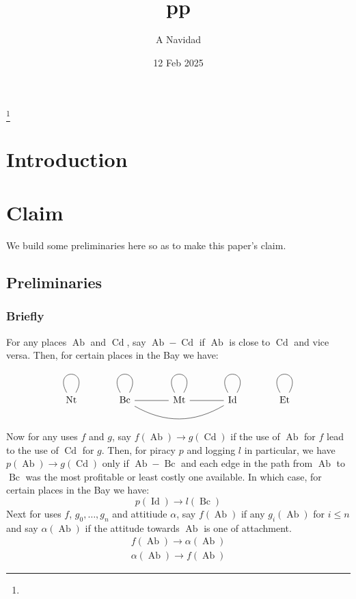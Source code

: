 \documentclass{amsart}
\DeclareMathOperator{\id}{Id}%
\DeclareMathOperator{\mt}{Mt}%
\DeclareMathOperator{\bc}{Bc}%
\DeclareMathOperator{\et}{Et}%
\DeclareMathOperator{\nt}{Nt}%
\DeclareMathOperator{\ab}{Ab}%
\DeclareMathOperator{\cd}{Cd}%
\theoremstyle{definition}%
\theoremstyle{definition}%
\theoremstyle{remark}%
\begin{document}
%
%
\title{pp}
\author{A Navidad}
\address{Harvard College, Cambridge MA}
\date{12 Feb 2025}
\thanks{\lipsum[1][1-3]}%
%
%
\begin{abstract}
\lipsum[1][1-6]
\end{abstract}
\keywords{\lipsum[1][1]}
%
%
\maketitle
%
%
%
%
\section{Introduction}
\label{s:intro}
\lipsum[1-2]
%
%
%
%
\section{Claim}%
\label{s:claim}
We build some preliminaries here so as to make this paper's claim.
%
\subsection{Preliminaries}
\label{ss:prelims}
\subsubsection{Briefly}
\label{sss:briefly}
For any places \(\ab\) and \(\cd\), say \(\ab-\cd\) if \(\ab\) is close to \(\cd\) and vice versa. Then, for certain places in the Bay we have:
%
\begin{equation}
\label{}
\begin{tikzcd}[arrows=dash,sep=large]
\nt \rar[out=120,in=60,loop] &\bc \rar \rar[out=120,in=60,loop] \ar[rr,bend right] &\mt \rar \rar[out=120,in=60,loop] &\id \rar[out=120,in=60,loop] &\et \rar[out=120,in=60,loop]
\end{tikzcd}
\end{equation}
%
Now for any uses \(f\) and \(g\), say \(f(\ab)\to g(\cd)\) if the use of \(\ab\) for \(f\) lead to the use of \(\cd\) for \(g\). Then, for piracy \(p\) and logging \(l\) in particular, we have \(p(\ab)\to g(\cd)\) only if \(\ab-\bc\) and each edge in the path from \(\ab\) to \(\bc\) was the most profitable or least costly one available. In which case, for certain places in the Bay we have:
%
\begin{equation}
\label{}
p(\id)\to l(\bc)
\end{equation}
%
Next for uses \(f\), \(g_{0},\ldots,g_{n}\) and attitiude \(\alpha\), say \(f(\ab)\) if any \(g_{i}(\ab)\) for \(i\leq n\) and say \(\alpha(\ab)\) if the attitude towards \(\ab\) is one of attachment.%
%
\begin{gather}
f(\ab)\to\alpha(\ab)\\
\alpha(\ab)\to f(\ab)
\end{gather}
%
\end{document}
